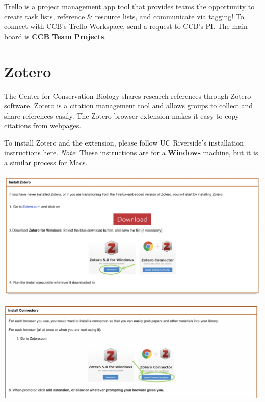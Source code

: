 \documentclass[
]{book}
\begin{document}
\href{https://trello.com/en}{Trello} is a project management app tool that provides teams the opportunity to create task lists, reference \& resource lists, and communicate via tagging! To connect with CCB's Trello Workspace, send a request to CCB's PI. The main board is \textbf{CCB Team Projects}.

\hypertarget{zotero}{%
\section{Zotero}\label{zotero}}

The Center for Conservation Biology shares research references through Zotero software. Zotero is a citation management tool and allows groups to collect and share references easily. The Zotero browser extension makes it easy to copy citations from webpages.

To install Zotero and the extension, please follow UC Riverside's installation instructions \href{https://guides.lib.ucr.edu/c.php?g=171064}{here}. \emph{Note}: These instructions are for a \textbf{Windows} machine, but it is a similar process for Macs.

\begin{center}\includegraphics[width=24.56in]{images/zoteroinstall} \end{center}

\begin{center}\includegraphics[width=24.64in]{images/zoteroextension} \end{center}
\end{document}
